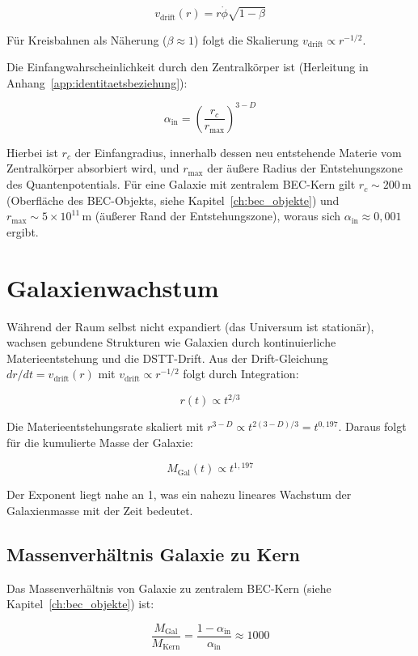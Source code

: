 \[
v_{\text{drift}}(r) = r\dot{\phi} \sqrt{1-\beta}
\]

Für Kreisbahnen als Näherung (\(\beta \approx 1\)) folgt die Skalierung \( v_{\text{drift}} \propto r^{-1/2} \).

Die Einfangwahrscheinlichkeit durch den Zentralkörper ist (Herleitung in Anhang~\ref{app:identitaetsbeziehung}):

\[
\alpha_{\text{in}} = \left( \frac{r_c}{r_{\text{max}}} \right)^{3-D}
\]

Hierbei ist \( r_c \) der Einfangradius, innerhalb dessen neu entstehende Materie vom Zentralkörper absorbiert wird, und \( r_{\text{max}} \) der äußere Radius der Entstehungszone des Quantenpotentials. Für eine Galaxie mit zentralem BEC-Kern gilt \( r_c \sim 200 \, \text{m} \) (Oberfläche des BEC-Objekts, siehe Kapitel~\ref{ch:bec_objekte}) und \( r_{\text{max}} \sim 5 \times 10^{11} \, \text{m} \) (äußerer Rand der Entstehungszone), woraus sich \( \alpha_{\text{in}} \approx 0,001 \) ergibt.

\section{Galaxienwachstum}
\label{sec:kosmo_galaxienwachstum}

Während der Raum selbst nicht expandiert (das Universum ist stationär), wachsen gebundene Strukturen wie Galaxien durch kontinuierliche Materieentstehung und die DSTT-Drift. Aus der Drift-Gleichung \( dr/dt = v_{\text{drift}}(r) \) mit \( v_{\text{drift}} \propto r^{-1/2} \) folgt durch Integration:

\[
r(t) \propto t^{2/3}
\]

Die Materieentstehungsrate skaliert mit \( r^{3-D} \propto t^{2(3-D)/3} = t^{0,197} \). Daraus folgt für die kumulierte Masse der Galaxie:

\[
M_{\text{Gal}}(t) \propto t^{1,197}
\]

Der Exponent liegt nahe an 1, was ein nahezu lineares Wachstum der Galaxienmasse mit der Zeit bedeutet.

\subsection{Massenverhältnis Galaxie zu Kern}
\label{sub:kosmo_massenverhaeltnis}

Das Massenverhältnis von Galaxie zu zentralem BEC-Kern (siehe Kapitel~\ref{ch:bec_objekte}) ist:

\[
\frac{M_{\text{Gal}}}{M_{\text{Kern}}} = \frac{1 - \alpha_{\text{in}}}{\alpha_{\text{in}}} \approx 1000
\]

